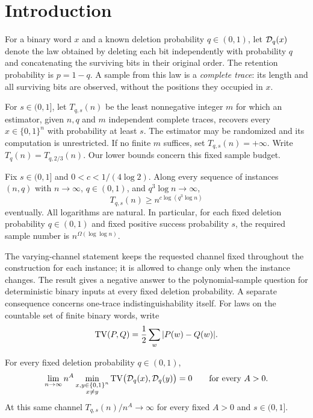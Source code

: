 \section{Introduction}\label{sec:introduction}

For a binary word $x$ and a known deletion probability $q\in(0,1)$, let $\mathcal D_q(x)$ denote the law obtained by deleting each bit independently with probability $q$ and concatenating the surviving bits in their original order.  The retention probability is $p=1-q$.  A sample from this law is a \emph{complete trace}: its length and all surviving bits are observed, without the positions they occupied in $x$.

For $s\in(0,1]$, let $T_{q,s}(n)$ be the least nonnegative integer $m$ for which an estimator, given $n,q$ and $m$ independent complete traces, recovers every $x\in\{0,1\}^n$ with probability at least $s$.  The estimator may be randomized and its computation is unrestricted.  If no finite $m$ suffices, set $T_{q,s}(n)=+\infty$.  Write $T_q(n)=T_{q,2/3}(n)$.  Our lower bounds concern this fixed sample budget.

\begin{theorem}\label{thm:main}
Fix $s\in(0,1]$ and $0<c<1/(4\log2)$.  Along every sequence of instances $(n,q)$ with $n\to\infty$, $q\in(0,1)$, and $q^3\log n\to\infty$,
\begin{equation}\label{eq:main-bound}
 T_{q,s}(n)\ge n^{c\log(q^3\log n)}
\end{equation}
eventually.  All logarithms are natural.  In particular, for each fixed deletion probability $q\in(0,1)$ and fixed positive success probability $s$, the required sample number is $n^{\Omega(\log\log n)}$.
\end{theorem}

The varying-channel statement keeps the requested channel fixed throughout the construction for each instance; it is allowed to change only when the instance changes.  The result gives a negative answer to the polynomial-sample question for deterministic binary inputs at every fixed deletion probability.  A separate consequence concerns one-trace indistinguishability itself.  For laws on the countable set of finite binary words, write
\[
 \operatorname{TV}(P,Q)=\frac12\sum_w|P(w)-Q(w)|.
\]

\begin{theorem}\label{thm:tv}
For every fixed deletion probability $q\in(0,1)$,
\begin{equation}\label{eq:min-tv}
 \lim_{n\to\infty}n^A
 \min_{\substack{x,y\in\{0,1\}^n\\x\ne y}}
 \operatorname{TV}\bigl(\mathcal D_q(x),\mathcal D_q(y)\bigr)=0
 \qquad\text{for every }A>0.
\end{equation}
At this same channel $T_{q,s}(n)/n^A\to\infty$ for every fixed $A>0$ and $s\in(0,1]$.
\end{theorem}

